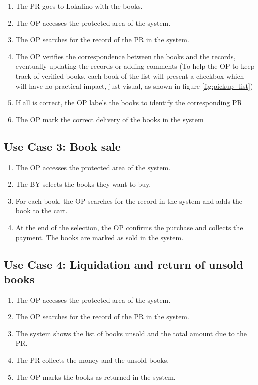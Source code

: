 \begin{enumerate}
    \item The PR goes to Lokalino with the books.
    \item The OP accesses the protected area of the system.
    \item The OP searches for the record of the PR in the system.
    \item The OP verifies the correspondence between the books and the records, eventually updating the records or adding comments (To help the OP to keep track of verified books, each book of the list will present a checkbox which will have no practical impact, just visual, as shown in figure \ref{fig:pickup_list})
    \item If all is correct, the OP labels the books to identify the corresponding PR
    \item The OP mark the correct delivery of the books in the system
\end{enumerate}

\subsection{Use Case 3: Book sale}

\begin{enumerate}
    \item The OP accesses the protected area of the system.
    \item The BY selects the books they want to buy.
    \item For each book, the OP searches for the record in the system and adds the book to the cart.
    \item At the end of the selection, the OP confirms the purchase and collects the payment. The books are marked as sold in the system.
\end{enumerate}

\subsection{Use Case 4: Liquidation and return of unsold books}

\begin{enumerate}
    \item The OP accesses the protected area of the system.
    \item The OP searches for the record of the PR in the system.
    \item The system shows the list of books unsold and the total amount due to the PR.
    \item The PR collects the money and the unsold books.
    \item The OP marks the books as returned in the system.
\end{enumerate}

